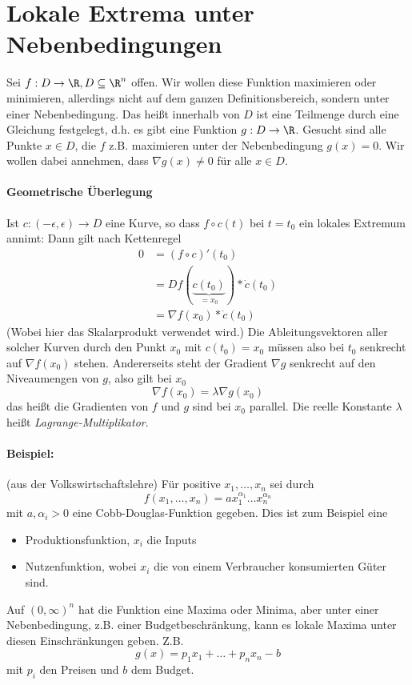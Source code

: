\section{Lokale Extrema unter Nebenbedingungen}
Sei $f:D\rightarrow \R, D\subseteq \R^n$ offen. Wir wollen diese Funktion maximieren oder minimieren, allerdings nicht auf dem ganzen Definitionsbereich, sondern unter einer Nebenbedingung. Das heißt innerhalb von $D$ ist eine Teilmenge durch eine Gleichung festgelegt, d.h. es gibt eine Funktion $g:D\rightarrow \R$. Gesucht sind alle Punkte $x\in D$, die $f$ z.B. maximieren unter der Nebenbedingung $g(x)=0$. Wir wollen dabei annehmen, dass $\nabla g(x)\neq 0$ für alle $x\in D$.

\paragraph{Geometrische Überlegung}
Ist $c:(-\epsilon,\epsilon)\rightarrow D$ eine Kurve, so dass $f\circ c(t)$ bei $t=t_0$ ein lokales Extremum annimt: Dann gilt nach Kettenregel
\begin{align*}
	0&=\left(f\circ c\right)'(t_0)\\
	&=Df(\underbrace{c(t_0)}_{=x_0}) *\dot c(t_0)\\
	&=\nabla f(x_0)*\dot c(t_0)
\end{align*}
(Wobei hier das Skalarprodukt verwendet wird.)
Die Ableitungsvektoren aller solcher Kurven durch den Punkt $x_0$ mit $c(t_0)=x_0$ müssen also bei $t_0$ senkrecht auf $\nabla f(x_0)$ stehen. Andererseits steht der Gradient $\nabla g$ senkrecht auf den Niveaumengen von $g$, also gilt bei $x_0$
\begin{equation*}
	\nabla f(x_0)=\lambda \nabla g(x_0)
\end{equation*}
das heißt die Gradienten von $f$ und $g$ sind bei $x_0$ parallel. Die reelle Konstante $\lambda$ heißt \emph{Lagrange-Multiplikator}.

\paragraph{Beispiel:} (aus der Volkswirtschaftslehre) Für positive $x_1,\ldots,x_n$ sei durch
\begin{equation*}
	f(x_1,\ldots,x_n) =ax_1^{\alpha_1}\ldots x_n^{\alpha_n}
\end{equation*}
mit $a,\alpha_i>0$ eine Cobb-Douglas-Funktion gegeben. Dies ist zum Beispiel eine
\begin{itemize}
	\item Produktionsfunktion, $x_i$ die Inputs
	\item Nutzenfunktion, wobei $x_i$ die von einem Verbraucher konsumierten Güter sind.
\end{itemize}
Auf $(0,\infty)^n$ hat die Funktion eine Maxima oder Minima, aber unter einer Nebenbedingung, z.B. einer Budgetbeschränkung, kann es lokale Maxima unter diesen Einschränkungen geben. Z.B.
\begin{equation*}
	g(x)=p_1 x_1+\ldots+p_nx_n-b
\end{equation*}
mit $p_i$ den Preisen und $b$ dem Budget.

